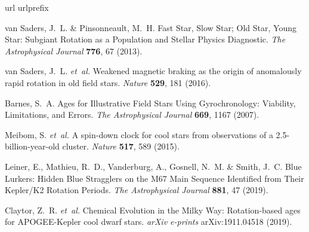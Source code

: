 \begin{thebibliography}{10}
	\expandafter\ifx\csname url\endcsname\relax
	\def\url#1{\texttt{#1}}\fi
	\expandafter\ifx\csname urlprefix\endcsname\relax\def\urlprefix{URL }\fi
	\providecommand{\bibinfo}[2]{#2}
	\providecommand{\eprint}[2][]{\url{#2}}
	
	\bibinfo{author}{{van Saders}, J.~L.} \& \bibinfo{author}{Pinsonneault, M.~H.}
	\newblock \bibinfo{title}{Fast {{Star}}, {{Slow Star}}; {{Old Star}}, {{Young
				Star}}: {{Subgiant Rotation}} as a {{Population}} and {{Stellar Physics
				Diagnostic}}}.
	\newblock \emph{\bibinfo{journal}{The Astrophysical Journal}}
	\textbf{\bibinfo{volume}{776}}, \bibinfo{pages}{67} (\bibinfo{year}{2013}).
	
	\bibinfo{author}{{van Saders}, J.~L.} \emph{et~al.}
	\newblock \bibinfo{title}{Weakened magnetic braking as the origin of
		anomalously rapid rotation in old field stars}.
	\newblock \emph{\bibinfo{journal}{Nature}} \textbf{\bibinfo{volume}{529}},
	\bibinfo{pages}{181} (\bibinfo{year}{2016}).
	
	\bibinfo{author}{Barnes, S.~A.}
	\newblock \bibinfo{title}{Ages for {{Illustrative Field Stars Using
				Gyrochronology}}: {{Viability}}, {{Limitations}}, and {{Errors}}}.
	\newblock \emph{\bibinfo{journal}{The Astrophysical Journal}}
	\textbf{\bibinfo{volume}{669}}, \bibinfo{pages}{1167} (\bibinfo{year}{2007}).
	
	\bibinfo{author}{Meibom, S.} \emph{et~al.}
	\newblock \bibinfo{title}{A spin-down clock for cool stars from observations of
		a 2.5-billion-year-old cluster}.
	\newblock \emph{\bibinfo{journal}{Nature}} \textbf{\bibinfo{volume}{517}},
	\bibinfo{pages}{589} (\bibinfo{year}{2015}).
	
	\bibinfo{author}{Leiner, E.}, \bibinfo{author}{Mathieu, R.~D.},
	\bibinfo{author}{Vanderburg, A.}, \bibinfo{author}{Gosnell, N.~M.} \&
	\bibinfo{author}{Smith, J.~C.}
	\newblock \bibinfo{title}{Blue {{Lurkers}}: {{Hidden Blue Stragglers}} on the
		{{M67 Main Sequence Identified}} from {{Their Kepler}}/{{K2 Rotation
				Periods}}}.
	\newblock \emph{\bibinfo{journal}{The Astrophysical Journal}}
	\textbf{\bibinfo{volume}{881}}, \bibinfo{pages}{47} (\bibinfo{year}{2019}).
	
	\bibinfo{author}{Claytor, Z.~R.} \emph{et~al.}
	\newblock \bibinfo{title}{Chemical {{Evolution}} in the {{Milky Way}}:
		{{Rotation}}-based ages for {{APOGEE}}-{{Kepler}} cool dwarf stars}.
	\newblock \emph{\bibinfo{journal}{arXiv e-prints}}
	\bibinfo{pages}{arXiv:1911.04518} (\bibinfo{year}{2019}).
	

\end{thebibliography}

